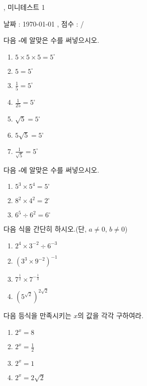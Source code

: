 \documentclass[a4paper]{oblivoir}
\begin{document}
\begin{center}
, 미니테스트 1
\end{center}
\begin{center}
날짜 : \today
,\qquad
점수 :  / 
\end{center}

%
\prob
다음 \(\square\)에 알맞은 수를 써넣으시오.
\\[-10pt]
\begin{enumerate}[(1)]
\item
\(5\times5\times5=5^\square\)
\item
\(5=5^\square\)
\item
\(\frac15=5^\square\)
\item
\(\frac1{25}=5^\square\)
\item
\(\sqrt5 = 5^\square\)
\item
\(5\sqrt5 = 5^\square\)
\item
\(\frac1{\sqrt5}=5^\square\)
\end{enumerate}

%
\prob
다음 \(\square\)에 알맞은 수를 써넣으시오.
\\[-10pt]
\begin{enumerate}[(1)]
\item
\(5^3\times5^4=5^\square\)
\item
\(8^2\times4^2=2^\square\)
\item
\(6^5\div6^2=6^\square\)
\end{enumerate}

%
\prob
다음 식을 간단히 하시오.(단, \(a\neq0\), \(b\neq0\))
\begin{enumerate}[(1)]
\item
\(2^4\times3^{-2}\div6^{-3}\)
\item
\((3^3\times9^{-2})^{-1}\)
\item
\(7^{\frac12}\times7^{-\frac13}\)
\item
\((5^{\sqrt2})^{2\sqrt2}\)
\end{enumerate}

%
\prob
다음 등식을 만족시키는 \(x\)의 값을 각각 구하여라.
\begin{enumerate}[(1)]
\item
\(2^x=8\)
\item
\(2^x=\frac12\)
\item
\(2^x=1\)
\item
\(2^x=2\sqrt2\)
\end{enumerate}
\end{document}
